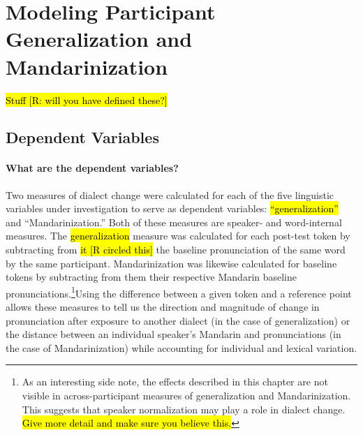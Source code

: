 \section{Modeling Participant Generalization and Mandarinization}
\label{sec:genAndMandModels}
\hl{Stuff [R: will you have defined these?]}
\subsection{Dependent Variables}
\paragraph{What are the dependent variables?} Two measures of dialect change were calculated for each of the five linguistic variables under investigation to serve as dependent variables: \hl{``generalization''} and ``Mandarinization.'' Both of these measures are speaker- and word-internal measures. The \hl{generalization} measure was calculated for each \ND{} post-test token by subtracting from \hl{it [R circled this]} the \ND{} baseline pronunciation of the same word by the same participant. Mandarinization was likewise calculated for \ND{} baseline tokens by subtracting from them their respective Mandarin baseline pronunciations.\footnote{As an interesting side note, the effects described in this chapter are not visible in across-participant measures of generalization and Mandarinization. This suggests that speaker normalization may play a role in dialect change. \hl{Give more detail and make sure you believe this.}}Using the difference between a given token and a reference point allows these measures to tell us the direction and magnitude of change in pronunciation after exposure to another dialect (in the case of generalization) or the distance between an individual speaker's Mandarin and \ND{} pronunciations (in the case of Mandarinization) while accounting for individual and lexical variation.%

